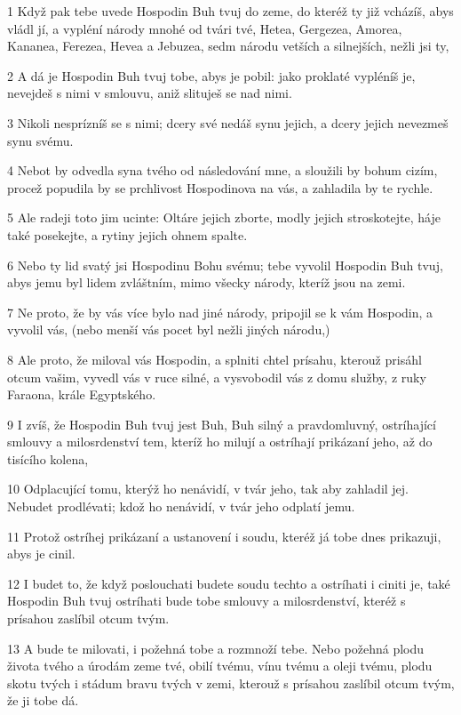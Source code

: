 \par 1 Když pak tebe uvede Hospodin Buh tvuj do zeme, do kteréž ty již vcházíš, abys vládl jí, a vypléní národy mnohé od tvári tvé, Hetea, Gergezea, Amorea, Kananea, Ferezea, Hevea a Jebuzea, sedm národu vetších a silnejších, nežli jsi ty,
\par 2 A dá je Hospodin Buh tvuj tobe, abys je pobil: jako proklaté vypléníš je, nevejdeš s nimi v smlouvu, aniž slituješ se nad nimi.
\par 3 Nikoli nesprízníš se s nimi; dcery své nedáš synu jejich, a dcery jejich nevezmeš synu svému.
\par 4 Nebot by odvedla syna tvého od následování mne, a sloužili by bohum cizím, procež popudila by se prchlivost Hospodinova na vás, a zahladila by te rychle.
\par 5 Ale radeji toto jim ucinte: Oltáre jejich zborte, modly jejich stroskotejte, háje také posekejte, a rytiny jejich ohnem spalte.
\par 6 Nebo ty lid svatý jsi Hospodinu Bohu svému; tebe vyvolil Hospodin Buh tvuj, abys jemu byl lidem zvláštním, mimo všecky národy, kteríž jsou na zemi.
\par 7 Ne proto, že by vás více bylo nad jiné národy, pripojil se k vám Hospodin, a vyvolil vás, (nebo menší vás pocet byl nežli jiných národu,)
\par 8 Ale proto, že miloval vás Hospodin, a splniti chtel prísahu, kterouž prisáhl otcum vašim, vyvedl vás v ruce silné, a vysvobodil vás z domu služby, z ruky Faraona, krále Egyptského.
\par 9 I zvíš, že Hospodin Buh tvuj jest Buh, Buh silný a pravdomluvný, ostríhající smlouvy a milosrdenství tem, kteríž ho milují a ostríhají prikázaní jeho, až do tisícího kolena,
\par 10 Odplacující tomu, kterýž ho nenávidí, v tvár jeho, tak aby zahladil jej. Nebudet prodlévati; kdož ho nenávidí, v tvár jeho odplatí jemu.
\par 11 Protož ostríhej prikázaní a ustanovení i soudu, kteréž já tobe dnes prikazuji, abys je cinil.
\par 12 I budet to, že když poslouchati budete soudu techto a ostríhati i ciniti je, také Hospodin Buh tvuj ostríhati bude tobe smlouvy a milosrdenství, kteréž s prísahou zaslíbil otcum tvým.
\par 13 A bude te milovati, i požehná tobe a rozmnoží tebe. Nebo požehná plodu života tvého a úrodám zeme tvé, obilí tvému, vínu tvému a oleji tvému, plodu skotu tvých i stádum bravu tvých v zemi, kterouž s prísahou zaslíbil otcum tvým, že ji tobe dá.
